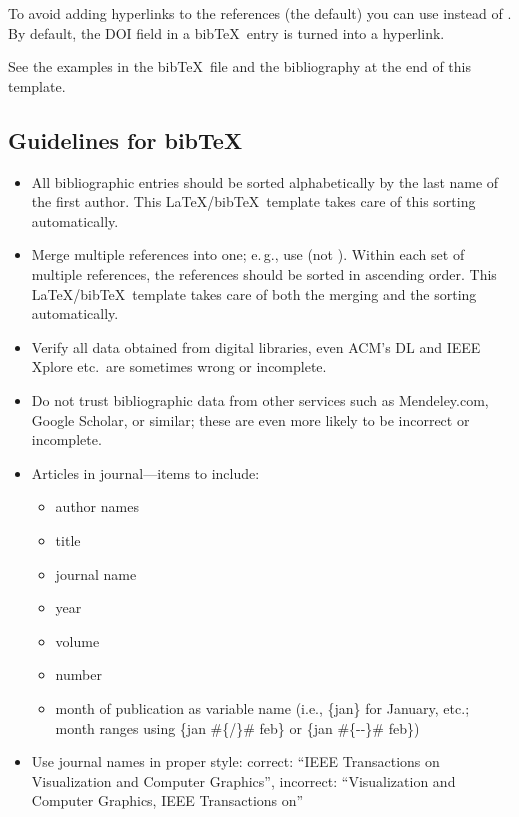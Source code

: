 \documentclass[journal]{vgtc}                %
\begin{document}
To avoid adding hyperlinks to the references (the default) you can use \verb|| instead of \verb||.
By default, the DOI field in a bib\TeX\ entry is turned into a hyperlink.

See the examples in the bib\TeX\ file and the bibliography at the end of this template.

\subsection{Guidelines for bibTeX}

\begin{itemize}
  \item All bibliographic entries should be sorted alphabetically by the last name of the first author.
        This \LaTeX/bib\TeX\ template takes care of this sorting automatically.
  \item Merge multiple references into one; e.\,g., use \cite{Max:1995:OMF,Kitware:2003} (not \cite{Kitware:2003}\cite{Max:1995:OMF}).
        Within each set of multiple references, the references should be sorted in ascending order.
        This \LaTeX/bib\TeX\ template takes care of both the merging and the sorting automatically.
  \item Verify all data obtained from digital libraries, even ACM's DL and IEEE Xplore  etc.\ are sometimes wrong or incomplete.
  \item Do not trust bibliographic data from other services such as Mendeley.com, Google Scholar, or similar; these are even more likely to be incorrect or incomplete.
  \item Articles in journal---items to include:
        \begin{itemize}
  	      \item author names
  	      \item title
  	      \item journal name
  	      \item year
  	      \item volume
  	      \item number
  	      \item month of publication as variable name (i.e., \{jan\} for January, etc.; month ranges using \{jan \#\{/\}\# feb\} or \{jan \#\{-{}-\}\# feb\})
        \end{itemize}
  \item Use journal names in proper style: correct: ``IEEE Transactions on Visualization and Computer Graphics'', incorrect: ``Visualization and Computer Graphics, IEEE Transactions on''

\end{itemize}
\end{document}
